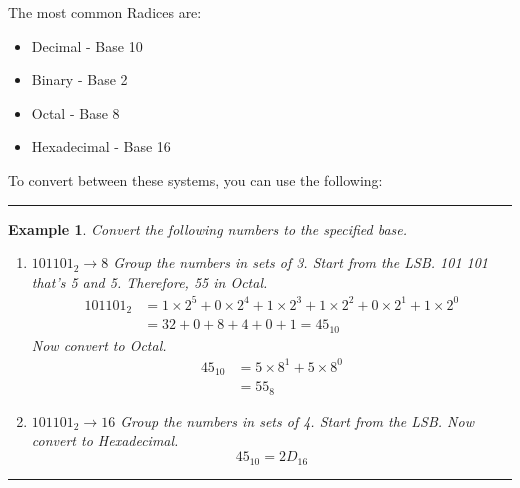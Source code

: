 \documentclass[12pt]{article}
\newtheorem{example}{Example}
\newenvironment{examp}
{
    \vspace{0.5cm}
    \hrule
    \begin{example}\upshape
}
{
    \end{example}
    \hrule
    \vspace{0.5cm}
}
\begin{document}
The most common Radices are:
\begin{itemize}
	\item Decimal - Base 10\\
	\item Binary - Base 2\\
	\item Octal - Base 8\\
	\item Hexadecimal - Base 16
\end{itemize}
To convert between these systems, you can use the following:
\begin{examp}
	Convert the following numbers to the specified base.
	\begin{enumerate}
		\item \(101101_2 \rightarrow 8\)
		      Group the numbers in sets of 3. Start from the LSB.
		      101  101    that's 5 and 5. Therefore, 55 in Octal.
		      \begin{align*}
			      101101_2 & = 1 \times 2^5 + 0 \times 2^4 + 1 \times 2^3 + 1 \times 2^2 + 0 \times 2^1 + 1 \times 2^0 \\
			               & = 32 + 0 + 8 + 4 + 0 + 1 = 45_{10}
		      \end{align*}
		      Now convert to Octal.
		      \begin{align*}
			      45_{10} & = 5 \times 8^1 + 5 \times 8^0 \\
			              & = 55_8
		      \end{align*}
		\item \(101101_2 \rightarrow 16\)
		      Group the numbers in sets of 4. Start from the LSB.
		      Now convert to Hexadecimal.
		      \[
			      45_{10}  = 2D_{16}
		      \]
	\end{enumerate}
\end{examp}
\end{document}
